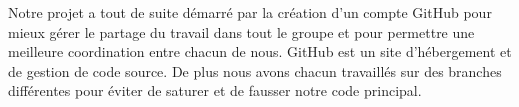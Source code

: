 Notre projet a tout de suite démarré par la création d'un compte GitHub pour mieux gérer le partage du travail dans tout le groupe et pour permettre une meilleure coordination entre chacun de nous. GitHub est un site d'hébergement et de gestion de code source. De plus nous avons chacun travaillés sur des branches différentes pour éviter de saturer et de fausser notre code principal.
